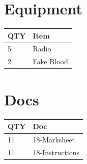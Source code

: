 \documentclass[10pt, A5]{article}
\begin{document}
\begin{framed}
\begin{minipage}{\textwidth}
        \begin{multicols}{2}

		\section*{\faWrench \: Equipment}

		
	\begin{center}
			\begin{tabular}{p{2cm}p{4cm}}


				\textbf{QTY} & \textbf{Item} \\\toprule
												5&Radio\\\midrule
												2&Fake Blood\\\midrule
								\end{tabular}

			\end{center}

		
		\vfill\null
		\columnbreak

			\section*{\faFile \: Docs}
		 	\begin{center}
			\begin{tabular}{p{2cm}p{4cm}}

			\textbf{QTY} & \textbf{Doc} \\\toprule
										11&18-Marksheet\\\midrule
										11&18-Instructions\\\midrule
							\end{tabular}
			\end{center}
	

		\vfill\null

		\end{multicols}
\end{minipage}
\end{framed}
\end{document}
